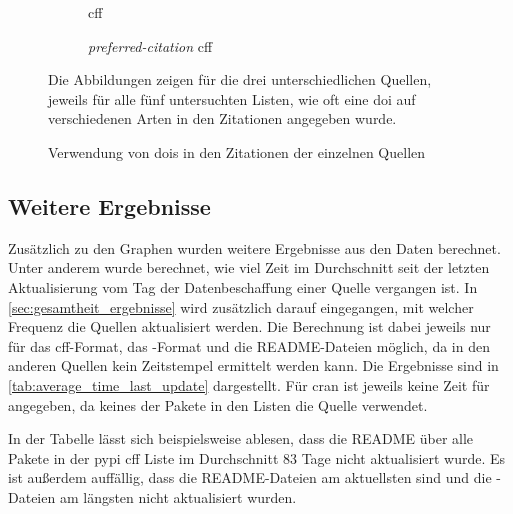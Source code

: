 \begin{figure}
    \begin{subfigure}{.5\textwidth}
        \centering
        
        \caption{\gls{cff}}
        \label{fig:cff_doi}
    \end{subfigure}%
    \begin{subfigure}{.5\textwidth}
        \centering
        
        \caption{\emph{preferred-citation} \gls{cff}}
        \label{fig:preferred_citation_doi}
    \end{subfigure}
    \begin{center}
        \begin{subfigure}{.5\textwidth}
            \centering
            
            \caption{}
            \label{fig:bib_doi}
        \end{subfigure}
    \end{center}
    \caption{Verwendung von \gls{doi}s in den Zitationen der einzelnen Quellen}
    \label{fig:doi}
    \small
    Die Abbildungen zeigen für die drei unterschiedlichen Quellen, jeweils für alle fünf untersuchten Listen, wie oft eine \gls{doi} auf verschiedenen Arten in den Zitationen angegeben wurde.
\end{figure}

\subsection*{Weitere Ergebnisse}
Zusätzlich zu den Graphen wurden weitere Ergebnisse aus den Daten berechnet.
Unter anderem wurde berechnet, wie viel Zeit im Durchschnitt seit der letzten Aktualisierung vom Tag der Datenbeschaffung einer Quelle vergangen ist.
In \autoref{sec:gesamtheit_ergebnisse} wird zusätzlich darauf eingegangen, mit welcher Frequenz die Quellen aktualisiert werden.
Die Berechnung ist dabei jeweils nur für das \gls{cff}-Format, das -Format und die README-Dateien möglich, da in den anderen Quellen kein Zeitstempel ermittelt werden kann.
Die Ergebnisse sind in \autoref{tab:average_time_last_update} dargestellt.
Für \gls{cran} ist jeweils keine Zeit für  angegeben, da keines der Pakete in den Listen die Quelle verwendet.

In der Tabelle lässt sich beispielsweise ablesen, dass die README über alle Pakete in der \gls{pypi} \gls{cff} Liste im Durchschnitt 83 Tage nicht aktualisiert wurde.
Es ist außerdem auffällig, dass die README-Dateien am aktuellsten sind und die -Dateien am längsten nicht aktualisiert wurden.

